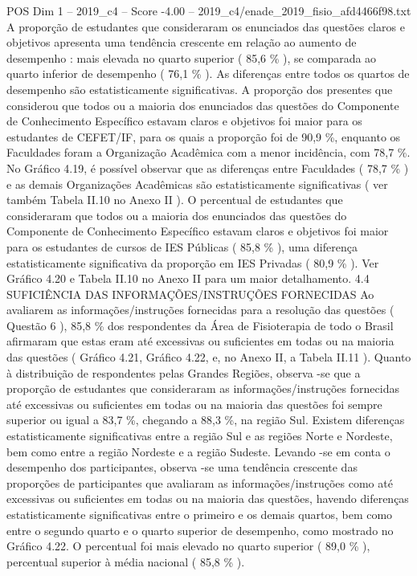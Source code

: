 \begin{textsample}{POS Dim 1 – 2019\_c4 – Score -4.00 – 2019\_c4/enade\_2019\_fisio\_afd4466f98.txt}
A proporção de estudantes que consideraram os enunciados das questões claros e objetivos apresenta uma tendência crescente em relação ao aumento de desempenho : mais elevada no quarto superior ( 85,6 \% ), se comparada ao quarto inferior de desempenho ( 76,1 \% ).
As diferenças entre todos os quartos de desempenho são estatisticamente significativas.
A proporção dos presentes que considerou que todos ou a maioria dos enunciados das questões do Componente de Conhecimento Específico estavam claros e objetivos foi maior para os estudantes de CEFET/IF, para os quais a proporção foi de 90,9 \%, enquanto os Faculdades foram a Organização Acadêmica com a menor incidência, com 78,7 \%.
No Gráfico 4.19, é possível observar que as diferenças entre Faculdades ( 78,7 \% ) e as demais Organizações Acadêmicas são estatisticamente significativas ( ver também Tabela II.10 no Anexo II ).
O percentual de estudantes que consideraram que todos ou a maioria dos enunciados das questões do Componente de Conhecimento Específico estavam claros e objetivos foi maior para os estudantes de cursos de IES Públicas ( 85,8 \% ), uma diferença estatisticamente significativa da proporção em IES Privadas ( 80,9 \% ).
Ver Gráfico 4.20 e Tabela II.10 no Anexo II para um maior detalhamento. 4.4 SUFICIÊNCIA DAS INFORMAÇÕES/INSTRUÇÕES FORNECIDAS Ao avaliarem as informações/instruções fornecidas para a resolução das questões ( Questão 6 ), 85,8 \% dos respondentes da Área de Fisioterapia de todo o Brasil afirmaram que estas eram até excessivas ou suficientes em todas ou na maioria das questões ( Gráfico 4.21, Gráfico 4.22, e, no Anexo II, a Tabela II.11 ).
Quanto à distribuição de respondentes pelas Grandes Regiões, observa -se que a proporção de estudantes que consideraram as informações/instruções fornecidas até excessivas ou suficientes em todas ou na maioria das questões foi sempre superior ou igual a 83,7 \%, chegando a 88,3 \%, na região Sul.
Existem diferenças estatisticamente significativas entre a região Sul e as regiões Norte e Nordeste, bem como entre a região Nordeste e a região Sudeste.
Levando -se em conta o desempenho dos participantes, observa -se uma tendência crescente das proporções de participantes que avaliaram as informações/instruções como até excessivas ou suficientes em todas ou na maioria das questões, havendo diferenças estatisticamente significativas entre o primeiro e os demais quartos, bem como entre o segundo quarto e o quarto superior de desempenho, como mostrado no Gráfico 4.22.
O percentual foi mais elevado no quarto superior ( 89,0 \% ), percentual superior à média nacional ( 85,8 \% ).

\end{textsample}
